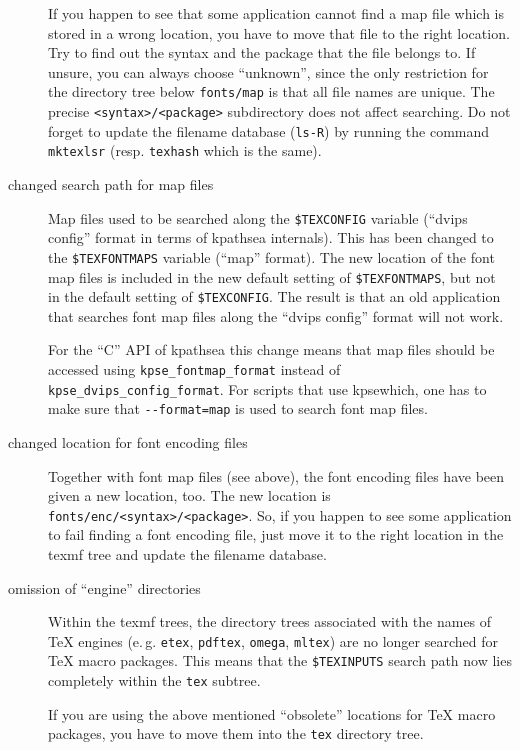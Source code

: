 \documentclass[11pt,a4paper]{article}
\begin{document}
\begin{description}
  If you happen to see that some application cannot find a map file
  which is stored in a wrong location, you have to move that file to
  the right location. Try to find out the syntax and the package that
  the file belongs to. If unsure, you can always choose ``unknown'',
  since the only restriction for the directory tree below
  \verb+fonts/map+ is that all file names are unique. The precise
  \verb+<syntax>/<package>+ subdirectory does not affect searching. Do
  not forget to update the filename database (\verb+ls-R+) by running
  the command \verb+mktexlsr+ (resp.  \verb+texhash+ which is the
  same).

\item [changed search path for map files] Map files used to be
  searched along the \verb+$TEXCONFIG+ %
  variable (``dvips config'' format in terms of kpathsea internals).
  This has been changed to the \verb+$TEXFONTMAPS+ %
  variable (``map'' format). The new location of the font map files is
  included in the new default setting of \verb+$TEXFONTMAPS+, %
  but not in the default setting of \verb+$TEXCONFIG+. %
  The result is that an old application that searches font map files
  along the ``dvips config'' format will not work.
  
  For the ``C'' API of kpathsea this change means that map files
  should be accessed using \verb+kpse_fontmap_format+ instead of
  \verb+kpse_dvips_config_format+. For scripts that use kpsewhich, one
  has to make sure that \verb+--format=map+ is used to search font map
  files.
  
\item [changed location for font encoding files] Together with font
  map files (see above), the font encoding files have been given a new
  location, too. The new location is
  \verb+fonts/enc/<syntax>/<package>+. So, if you happen to see some
  application to fail finding a font encoding file, just move it to
  the right location in the texmf tree and update the filename
  database.
  
\item [omission of ``engine'' directories] Within the texmf trees, the
  directory trees associated with the names of \TeX{} engines (e.\,g.
  \verb+etex+, \verb+pdftex+, \verb+omega+, \verb+mltex+) are no
  longer searched for \TeX{} macro packages. This means that the \verb+$TEXINPUTS+ %
  search path now lies completely within the \verb+tex+ subtree.
  
  If you are using the above mentioned ``obsolete'' locations for
  \TeX{} macro packages, you have to move them into the \verb+tex+
  directory tree.
\end{description}
\end{document}
